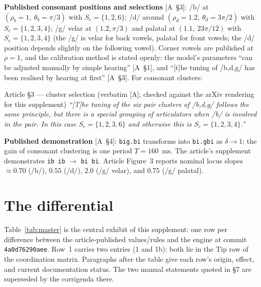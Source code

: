 \documentclass[11pt,letterpaper]{article}
\newcommand{\code}[1]{\texttt{#1}}
\begin{document}
\textbf{Published consonant positions and selections} \hbox{[A \S3]}:
/b/ at $(\rho_b{=}1,\ \theta_b{=}\pi/3)$ with $S_c=\{1,2,6\}$; /d/ around
$(\rho_d{=}1.2,\ \theta_d{=}3\pi/2)$ with $S_c=\{1,2,3,4\}$; /g/ velar at
$(1.2, \pi/3)$ and palatal at $(1.1,\ 23\pi/12)$ with $S_c=\{1,2,3,4\}$
(the /g/ is velar for back vowels, palatal for front vowels; the /d/ position
depends slightly on the following vowel). Corner vowels are published at
$\rho = 1$, and the calibration method is stated openly: the model's
parameters ``can be adjusted manually by simple hearing'' \hbox{[A \S1]}, and
``[t]he tuning of /b,d,g/ has been realised by hearing at first''
\hbox{[A \S3]}. For consonant clusters:
\begin{qbox}{Article \S3 --- cluster selection (verbatim [A];
checked against the arXiv rendering for this supplement)}
\small\itshape
``[T]he tuning of the six pair clusters of /b,d,g/ follows the same
principle, but there is a special grouping of articulators when /b/ is
involved in the pair. In this case $S_c=\{1,2,3,6\}$ and otherwise this is
$S_c=\{1,2,3,4\}$.''
\end{qbox}

\textbf{Published demonstration} \hbox{[A \S4]}: \code{big.bi} transforms
into \code{bi.gbi} as $\delta \to 1$; the gain of consonant clustering is one
period $T = 160$~ms. The article's supplement demonstrates
\code{ib\,ib} $\to$ \code{bi\,bi}. Article Figure~3 reports nominal locus
slopes $\approx 0.70$ (/b/), $0.55$ (/d/), $2.0$ (/g/ velar), and $0.75$
(/g/ palatal).

\section{The differential}

Table~\ref{tab:master} is the central exhibit of this supplement: one row per
difference between the article-published values/rules and the engine at
commit \code{4a0d76290aee}. Row~1 carries two entries (1 and 1b): both lie in
the Tip row of the coordination matrix. Paragraphs after the table give each
row's origin, effect, and current documentation status. The two manual
statements quoted in \S7 are superseded by the corrigenda there.
\end{document}
